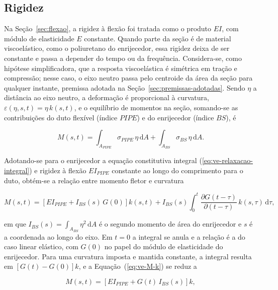 \documentclass[arial,centeredequations,english,brazilian,oneside,section=TITLE]{ifes8}
\begin{document}
\subsection{Rigidez}
\label{sub:rigidez}

Na Seção~\ref{sec:flexao}, a rigidez à flexão foi tratada como o produto $EI$, com módulo
de elasticidade $E$ constante. Quando parte da seção é de material viscoelástico, como
o poliuretano do enrijecedor, essa rigidez deixa de ser constante e passa a depender do
tempo ou da frequência. Considera-se, como hipótese simplificadora, que a resposta
viscoelástica é simétrica em tração e compressão; nesse caso, o eixo neutro passa pelo
centroide da área da seção para qualquer instante, premissa
adotada na Seção~\ref{sec:premissas-adotadas}. Sendo $\eta$ a distância ao eixo
neutro, a deformação é proporcional à curvatura, $\varepsilon(\eta, s, t) = \eta\,k(s,t)$,
e o equilíbrio de momentos na seção, somando-se as contribuições do duto flexível
(índice $PIPE$) e do enrijecedor (índice $BS$), é

\begin{equation}
  \label{eq:ve-M-tensoes}
  M(s,t) = \int_{A_{PIPE}} \sigma_{PIPE}\,\eta\,\mathrm{d}A
  + \int_{A_{BS}} \sigma_{BS}\,\eta\,\mathrm{d}A.
\end{equation}

Adotando-se para o enrijecedor a equação constitutiva integral
(\ref{eq:ve-relaxacao-integral}) e rigidez à flexão $EI_{PIPE}$ constante ao longo do
comprimento para o duto, obtém-se a relação entre momento fletor e curvatura
\cite{Caire2011}

\begin{equation}
  \label{eq:ve-M-k}
  M(s,t) = \left[EI_{PIPE} + I_{BS}(s)\,G(0)\right]k(s,t)
  + I_{BS}(s)\int_0^t \frac{\partial G(t - \tau)}{\partial (t - \tau)}\,k(s,\tau)\,\mathrm{d}\tau,
\end{equation}

em que $I_{BS}(s) = \int_{A_{BS}} \eta^2\,\mathrm{d}A$ é o segundo momento de área do
enrijecedor e $s$ é a coordenada ao longo do eixo. Em $t = 0$ a integral se anula e a
relação é a do caso linear elástico, com $G(0)$ no papel do módulo de elasticidade do
enrijecedor. Para uma curvatura imposta e mantida constante, a integral
resulta em $\left[G(t) - G(0)\right]k$, e a Equação~(\ref{eq:ve-M-k}) se reduz a

\begin{equation}
  \label{eq:ve-rigidez-relaxada}
  M(s,t) = \left[EI_{PIPE} + G(t)\,I_{BS}(s)\right]k,
\end{equation}
\end{document}
